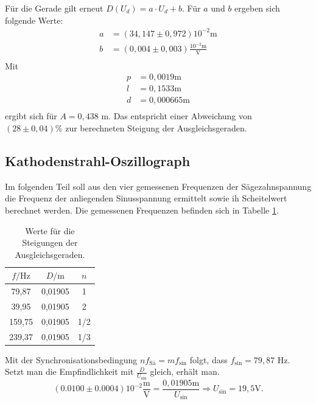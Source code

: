 Für die Gerade gilt erneut $D(U_d)=a\cdot U_d+b$. Für $a$ und $b$ ergeben sich folgende Werte:
\begin{align}
  a&=(34,147 \pm 0,972)10^{-2}\si{\meter}\\
  b&=(0,004 \pm 0,003)\frac{10^{-2}\si{\meter}}{\si{\volt}}\\
\end{align}
Mit
\begin{align}
  p&=0,0019 \si{\meter}\\
  l&=0,1533 \si{\meter} \\
  d&=0,000665 \si{\meter}\\
\end{align}
ergibt sich für $A=0,438$ \si{\meter}. Das entspricht einer Abweichung von $(28 \pm 0,04)\%$ zur berechneten Steigung der Ausgleichsgeraden.

\subsection{Kathodenstrahl-Oszillograph}
Im folgenden Teil soll aus den vier gemessenen Frequenzen der Sägezahnspannung die Frequenz der anliegenden Sinusspannung ermittelt sowie ih Scheitelwert berechnet werden. Die gemessenen Frequenzen befinden sich in Tabelle \ref{tab:frequenzen}.

\begin{table}
  \caption{Werte für die Steigungen der Ausgleichsgeraden.}
  \centering
  \label{tab:frequenzen}
  \begin{tabular}{c c c}
    \toprule
    $f / \si{\Hz}$ & $D/\si{\meter}$ &$n$ \\
    \midrule
79,87 & 0,01905 & 1 \\
39,95 & 0,01905 & 2\\
159,75 & 0,01905 & 1/2\\
239,37 & 0,01905 & 1/3\\
\bottomrule
\end{tabular}
\end{table}

Mit der Synchronisationsbedingung $n f_\mathrm{Sä}= m f_\mathrm{sin}$ folgt, dass $f_\mathrm{sin}=79,87$ \si{\Hz}.
Setzt man die Empfindlichkeit mit $\frac{D}{U_\mathrm{sin}}$ gleich, erhält man.
\begin{equation}
  (0.0100 \pm 0.0004)10^{-2}\frac{\si{\meter}}{\si{\volt}} = \frac{0,01905 \si{\meter}}{U_\mathrm{sin}}
\Rightarrow U_\mathrm{sin} = 19,5 \si{\volt}.
\end{equation}

